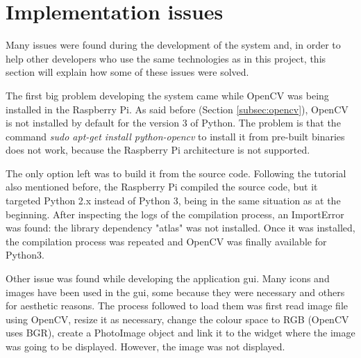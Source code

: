                                                                                                     
\section{Implementation issues}
Many issues were found during the development of the system and, in order to help other developers who use the same technologies as in this project, this section will explain how some of these issues were solved.

The first big problem developing the system came while OpenCV was being installed in the Raspberry Pi. As said before (Section \ref{subsec:opencv}), OpenCV is not installed by default for the version 3 of Python. The problem is that the command \textit{sudo apt-get install python-opencv} to install it from pre-built binaries does not work, because the Raspberry Pi architecture is not supported. 

The only option left was to build it from the source code. Following the tutorial also mentioned before, the Raspberry Pi compiled the source code, but it targeted Python 2.x instead of Python 3, being in the same situation as at the beginning. After inspecting the logs of the compilation process, an ImportError was found: the library dependency "atlas" was not installed. Once it was installed, the compilation process was repeated and OpenCV was finally available for Python3.

Other issue was found while developing the application \gls{gui}. Many icons and images have been used in the \gls{gui}, some because they were necessary and others for aesthetic reasons. The process followed to load them was first read image file using OpenCV, resize it as necessary, change the colour space to RGB (OpenCV uses BGR), create a PhotoImage object and link it to the widget where the image was going to be displayed. However, the image was not displayed. 

